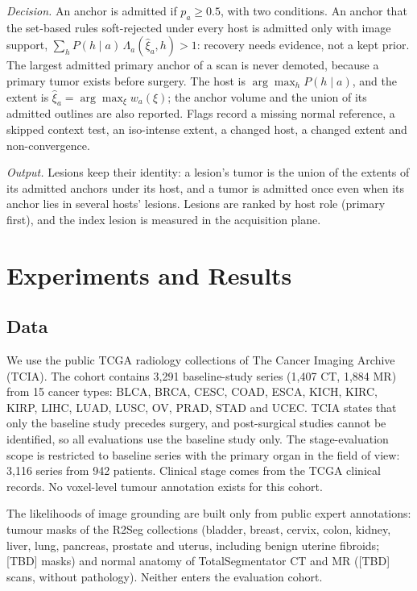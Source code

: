 \documentclass[fleqn,10pt]{olplainarticle}
\begin{document}
\emph{Decision.} An anchor is admitted if $p_a\ge0.5$, with two conditions. An anchor that the set-based rules soft-rejected
under every host is admitted only with image support, $\sum_h P(h\mid a)\,\Lambda_a(\hat\xi_a,h)>1$: recovery needs evidence, not
a kept prior. The largest admitted primary anchor of a scan is never demoted, because a primary tumor exists before surgery.
The host is $\arg\max_h P(h\mid a)$, and the extent is $\hat\xi_a=\arg\max_\xi w_a(\xi)$; the anchor volume and the union of its
admitted outlines are also reported. Flags record a missing normal reference, a skipped context test, an iso-intense extent, a
changed host, a changed extent and non-convergence.

\emph{Output.} Lesions keep their identity: a lesion's tumor is the union of the extents of its admitted anchors under its
host, and a tumor is admitted once even when its anchor lies in several hosts' lesions. Lesions are ranked by host role
(primary first), and the index lesion is measured in the acquisition plane.

\section{Experiments and Results}
\label{sec:results}

\subsection{Data}
We use the public TCGA radiology collections of The Cancer Imaging Archive (TCIA). The cohort contains 3{,}291
baseline-study series (1{,}407 CT, 1{,}884 MR) from 15 cancer types: BLCA, BRCA, CESC, COAD, ESCA, KICH, KIRC, KIRP,
LIHC, LUAD, LUSC, OV, PRAD, STAD and UCEC. TCIA states that only the baseline study precedes surgery, and post-surgical
studies cannot be identified, so all evaluations use the baseline study only. The stage-evaluation scope is restricted
to baseline series with the primary organ in the field of view: 3{,}116 series from 942 patients. Clinical stage comes
from the TCGA clinical records. No voxel-level tumour annotation exists for this cohort.

The likelihoods of image grounding are built only from public expert annotations: tumour masks of the R2Seg collections
(bladder, breast, cervix, colon, kidney, liver, lung, pancreas, prostate and uterus, including benign uterine fibroids;
[TBD] masks) and normal anatomy of
TotalSegmentator CT and MR ([TBD] scans, without pathology). Neither enters the evaluation cohort.
\end{document}
